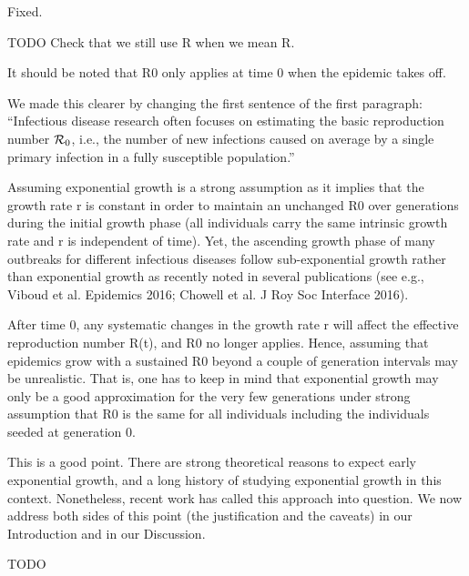 \documentclass[12pt]{article}
\newcommand{\Rx}[1]{\ensuremath{{\cal R}_{#1}}}
\newcommand{\Ro}{\Rx{0}}
\newcommand{\revtext}{\textsf}
\begin{document}
Fixed.

TODO Check that we still use R when we mean R.

\revtext{It should be noted that R0 only applies at time 0 when the epidemic takes off.}

We made this clearer by changing the first sentence of the first paragraph: ``Infectious disease research often focuses on estimating the basic reproduction number \Ro, i.e., the number of new infections caused on average by a single primary infection in a fully susceptible population.''

\revtext{Assuming exponential growth is a strong assumption as it
implies that the growth rate r is constant in order to maintain an
unchanged R0 over generations during the initial growth phase (all
individuals carry the same intrinsic growth rate and r is independent
of time). Yet, the ascending growth phase of many outbreaks for
different infectious diseases follow sub-exponential growth rather
than exponential growth as recently noted in several publications
(see e.g.,  Viboud et al. Epidemics 2016; Chowell et al. J Roy Soc
Interface 2016).}

\revtext{After time 0, any systematic changes in the growth rate r will
affect the effective reproduction number R(t), and R0 no longer
applies.  Hence, assuming that epidemics grow with a sustained R0
beyond a couple of generation intervals may be unrealistic. That is,
one has to keep in mind that exponential growth may only be a good
approximation for the very few generations under strong assumption
that R0 is the same for all individuals including the individuals
seeded at generation 0.}

This is a good point. There are strong theoretical reasons to expect early exponential growth, and a long history of studying exponential growth in this context. Nonetheless, recent work has called this approach into question. We now address both sides of this point (the justification and the caveats) in our Introduction and in our Discussion.

TODO
\end{document}
